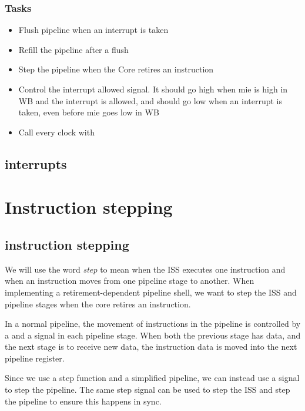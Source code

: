 \subsubsection{Tasks}

\begin{itemize}
    \item Flush pipeline when an interrupt is taken
    \item Refill the pipeline after a flush
    \item Step the pipeline when the Core retires an instruction
    \item Control the interrupt allowed signal. It should go high when mie is high in WB and the interrupt is allowed, and should go low when an interrupt is taken, even before mie goes low in WB 
    \item Call  every clock with 
\end{itemize}





\subsection{interrupts}

\section{Instruction stepping}

\subsection{instruction stepping}

We will use the word \textit{\gls{step}} to mean when the ISS executes one instruction and when an instruction moves from one pipeline stage to another. When implementing a retirement-dependent pipeline shell, we want to step the ISS and pipeline stages when the core retires an instruction.

In a normal pipeline, the movement of instructions in the pipeline is controlled by a  and a  signal in each pipeline stage. When both the previous stage has  data, and the next stage is  to receive new data, the instruction data is moved into the next pipeline register.

Since we use a step function and a simplified pipeline, we can instead use a  signal to step the pipeline. The same step signal can be used to step the ISS and step the pipeline to ensure this happens in sync.

